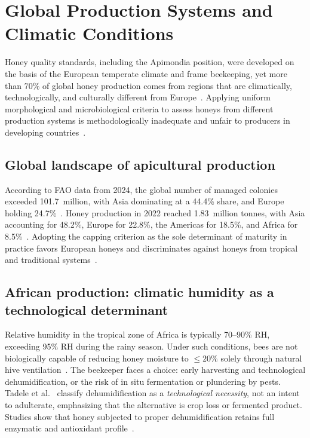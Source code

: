 \section{Global Production Systems and Climatic Conditions}

Honey quality standards, including the Apimondia position, were
developed on the basis of the European temperate climate and
frame beekeeping, yet more than 70\% of global honey production
comes from regions that are climatically, technologically, and
culturally different from
Europe~\cite{garcia2025,eudir2001110}. Applying uniform
morphological and microbiological criteria to assess honeys from
different production systems is methodologically inadequate and
unfair to producers in developing
countries~\cite{phiri2022,tadele2025}.

\subsection{Global landscape of apicultural production}

According to FAO data from 2024, the global number of managed
colonies exceeded 101.7~million, with Asia dominating
at a 44.4\% share, and Europe holding 24.7\%~\cite{destatis2026}.
Honey production in 2022 reached 1.83~million tonnes, with
Asia accounting for 48.2\%, Europe for 22.8\%, the Americas
for 18.5\%, and Africa for 8.5\%~\cite{phiri2022}. Adopting
the capping criterion as the sole determinant of maturity in
practice favors European honeys and discriminates against honeys
from tropical and traditional
systems~\cite{tadele2025,phiri2022}.

\subsection{African production: climatic humidity as a technological determinant}

Relative humidity in the tropical zone of Africa is typically
70--90\% RH, exceeding 95\% RH during the rainy season.
Under such conditions, bees are not biologically capable of
reducing honey moisture to $\leq 20\%$ solely through natural
hive ventilation~\cite{tadele2025}. The beekeeper faces a choice:
early harvesting and technological dehumidification, or the risk
of in situ fermentation or plundering by pests. Tadele et al.~\cite{tadele2025}
classify dehumidification as a \emph{technological necessity},
not an intent to adulterate, emphasizing that the alternative
is crop loss or fermented product. Studies show that honey
subjected to proper dehumidification retains full enzymatic
and antioxidant profile~\cite{lastriyanto2020,spel3upm}.

